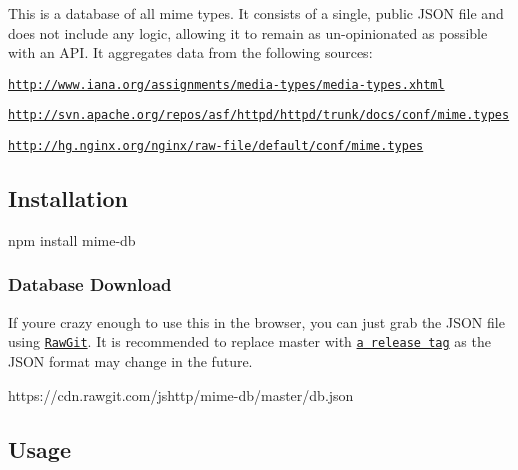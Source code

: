 \href{https://npmjs.org/package/mime-db}{\tt } \href{https://npmjs.org/package/mime-db}{\tt } \href{https://nodejs.org/en/download}{\tt } \href{https://travis-ci.org/jshttp/mime-db}{\tt } \href{https://coveralls.io/r/jshttp/mime-db?branch=master}{\tt }

This is a database of all mime types. It consists of a single, public J\+S\+ON file and does not include any logic, allowing it to remain as un-\/opinionated as possible with an A\+PI. It aggregates data from the following sources\+:


\begin{DoxyItemize}
\item \href{http://www.iana.org/assignments/media-types/media-types.xhtml}{\tt http\+://www.\+iana.\+org/assignments/media-\/types/media-\/types.\+xhtml}
\item \href{http://svn.apache.org/repos/asf/httpd/httpd/trunk/docs/conf/mime.types}{\tt http\+://svn.\+apache.\+org/repos/asf/httpd/httpd/trunk/docs/conf/mime.\+types}
\item \href{http://hg.nginx.org/nginx/raw-file/default/conf/mime.types}{\tt http\+://hg.\+nginx.\+org/nginx/raw-\/file/default/conf/mime.\+types}
\end{DoxyItemize}

\subsection*{Installation}


\begin{DoxyCode}
npm install mime-db
\end{DoxyCode}


\subsubsection*{Database Download}

If you\textquotesingle{}re crazy enough to use this in the browser, you can just grab the J\+S\+ON file using \href{https://rawgit.com/}{\tt Raw\+Git}. It is recommended to replace {\ttfamily master} with \href{https://github.com/jshttp/mime-db/tags}{\tt a release tag} as the J\+S\+ON format may change in the future.


\begin{DoxyCode}
https://cdn.rawgit.com/jshttp/mime-db/master/db.json
\end{DoxyCode}


\subsection*{Usage}


